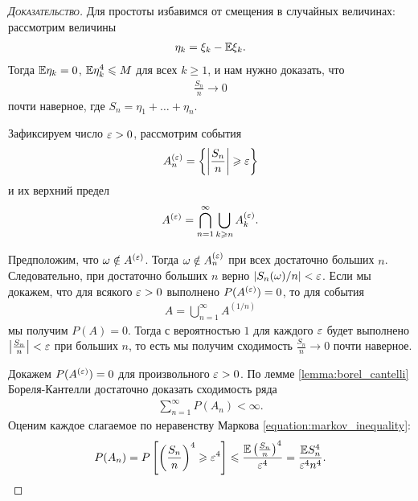 \documentclass[../main.tex]{subfiles}
\begin{document}
\begin{proof}[\normalfont\textsc{Доказательство}]
 Для простоты избавимся от смещения в случайных величинах: рассмотрим величины
 \begin{align*}
  \eta_k = \xi_k - \mathbb E\xi_k.
 \end{align*} Тогда $ \mathbb E\eta_k = 0 $, $ \mathbb E \eta_k^{4} \leqslant M $ для всех $ k \geqslant 1 $, и нам нужно доказать, что
 \begin{align*}
  \frac{S_n}{n} \to 0
 \end{align*} почти наверное, где $ S_n = \eta_1 + \ldots + \eta_n $.

 Зафиксируем число $ \varepsilon > 0 $, рассмотрим события
 \begin{align*}
  A_n^{(\varepsilon)} = \left\{ \left| \frac{S_n}{n} \right| \geqslant \varepsilon \right\}
 \end{align*} и их верхний предел
 \begin{align*}
  A^{(\varepsilon)} = \bigcap_{n=1}^{\infty} \bigcup_{k\geqslant n} A_k^{(\varepsilon)}.
 \end{align*}

 Предположим, что $ \omega \notin A^{(\varepsilon)} $. Тогда $ \omega \notin A_n^{(\varepsilon)} $ при всех достаточно больших $ n $. Следовательно, при достаточно больших $ n $ верно $ \left| S_n(\omega)/n \right| < \varepsilon $. Если мы докажем, что для всякого $ \varepsilon > 0 $ выполнено  $ P(A^{(\varepsilon)}) = 0 $, то для события
 \begin{align*}
  A = \bigcup_{n=1}^{\infty} A^{(1 / n)}
 \end{align*} мы получим $ P(A) = 0 $. Тогда с вероятностью  $ 1 $  для каждого $ \varepsilon $ будет выполнено  $ \left| \frac{S_n}{n} \right| < \varepsilon $ при больших $ n $, то есть мы получим сходимость $ \frac{S_n}{n} \to 0 $  почти наверное.

 Докажем $ P(A^{(\varepsilon)}) = 0 $ для произвольного $ \varepsilon > 0 $. По лемме \ref{lemma:borel_cantelli} Бореля-Кантелли достаточно доказать сходимость ряда
 \begin{align}
  \label{eq:uzbch_series}
  \sum_{n=1}^{\infty} P(A_n) < \infty.
 \end{align} Оценим каждое слагаемое по неравенству Маркова \eqref{equation:markov_inequality}:
 \begin{align*}
  P(A_n) = P \left[ \left( \frac{S_n}{n} \right)^{4} \geqslant \varepsilon^{4} \right] \leqslant \frac{\mathbb E \left( \frac{S_n}{n} \right)^{4}}{\varepsilon^{4}} = \frac{\mathbb E S_n^{4}}{\varepsilon^{4} n^{4}}.
 \end{align*} 


\end{proof}
\end{document}
